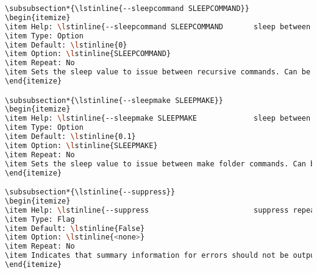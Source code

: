 \begin{snugshade}
\begin{lstlisting}[language=bash]
\subsubsection*{\lstinline{--sleepcommand SLEEPCOMMAND}}
\begin{itemize}
\item Help: \lstinline{--sleepcommand SLEEPCOMMAND       sleep between command calls}
\item Type: Option
\item Default: \lstinline{0}
\item Option: \lstinline{SLEEPCOMMAND}
\item Repeat: No
\item Sets the sleep value to issue between recursive commands. Can be used to throttle server connections.
\end{itemize}

\subsubsection*{\lstinline{--sleepmake SLEEPMAKE}}
\begin{itemize}
\item Help: \lstinline{--sleepmake SLEEPMAKE             sleep between make calls}
\item Type: Option
\item Default: \lstinline{0.1}
\item Option: \lstinline{SLEEPMAKE}
\item Repeat: No
\item Sets the sleep value to issue between make folder commands. Can be used to throttle server connections.
\end{itemize}

\subsubsection*{\lstinline{--suppress}}
\begin{itemize}
\item Help: \lstinline{--suppress                        suppress repeated error output}
\item Type: Flag
\item Default: \lstinline{False}
\item Option: \lstinline{<none>}
\item Repeat: No
\item Indicates that summary information for errors should not be output at end of execution. Output will otherwise be included depending on \lstinline{--verbose} flag.
\end{itemize}


\end{lstlisting}
\end{snugshade}
